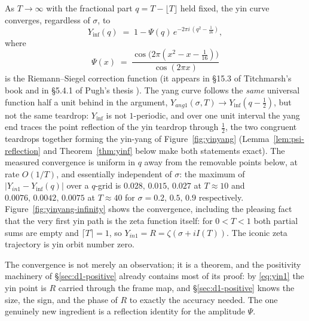 \documentclass[11pt]{article}
\theoremstyle{definition}
\begin{document}
As $T\to\infty$ with the fractional part $q=T-\lfloor T\rfloor$
held fixed, the yin curve converges, regardless of $\sigma$, to
\begin{equation}\label{eq:yinf}
Y_{\inf}(q)
\;=\;
1-\Psi(q)\,e^{-2\pi i\,(q^{2}-\frac{1}{16})},
\end{equation}
where
\begin{equation}\label{eq:psi-fn}
\Psi(x)\;=\;
\frac{\cos\!\bigl(2\pi(x^{2}-x-\tfrac{1}{16})\bigr)}{\cos(2\pi x)}
\end{equation}
is the Riemann--Siegel correction function (it appears in \S15.3 of
Titchmarsh's book \cite{Titchmarsh1986} and in \S5.4.1 of Pugh's
thesis \cite{Pugh1998}). The
yang curve follows the \emph{same} universal function half a unit behind in
the argument, $Y_{ang1}(\sigma,T)\to Y_{\inf}(q-\tfrac12)$, but not the
same teardrop: $Y_{\inf}$ is not $1$-periodic, and over one unit interval
the yang end traces the point reflection of the yin teardrop through
$\tfrac12$, the two congruent teardrops together forming the yin-yang of
Figure~\ref{fig:yinyang} (Lemma~\ref{lem:psi-reflection} and
Theorem~\ref{thm:yinf} below make both statements exact). The measured
convergence is uniform in $q$ away from
the removable points below, at rate $O(1/T)$, and essentially independent of
$\sigma$: the maximum of $|Y_{in1}-Y_{\inf}(q)|$ over a $q$-grid is
$0.028,\,0.015,\,0.027$ at $T\approx10$ and $0.0076,\,0.0042,\,0.0075$ at
$T\approx40$ for $\sigma=0.2,\,0.5,\,0.9$ respectively.
Figure~\ref{fig:yinyang-infinity} shows the convergence, including the
pleasing fact that the very first yin path is the zeta function itself: for
$0<T<1$ both partial sums are empty and $\lceil T\rceil=1$, so
$Y_{in1}=R=\zeta(\sigma+iI(T))$. The iconic zeta trajectory is yin orbit
number zero.

The convergence is not merely an observation; it is a theorem, and the
positivity machinery of \S\ref{sec:d1-positive} already contains most of its
proof: by \eqref{eq:yin1} the yin point is $R$ carried through the frame
map, and \S\ref{sec:d1-positive} knows the size, the sign, and the phase of
$R$ to exactly the accuracy needed. The one genuinely new ingredient is a
reflection identity for the amplitude $\Psi$.
\end{document}
